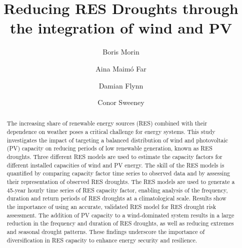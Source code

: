 \documentclass[preprint, 12pt]{elsarticle}
\begin{document}
\begin{frontmatter}
	

\title{Reducing RES Droughts through the integration of wind and PV}

\author[Math]{Boris Morin }

\author[Math]{Aina Maimó Far}

\author[Eng]{Damian Flynn}

\author[Math]{Conor Sweeney}




\begin{abstract}
The increasing share of renewable energy sources (RES) combined with their dependence on weather poses a critical challenge for energy systems. This study investigates the impact of targeting a balanced distribution of wind and photovoltaic (PV) capacity on reducing periods of low renewable generation, known as RES droughts. Three different RES models are used to estimate the capacity factors for different installed capacities of wind and PV energy. The skill of the RES models is quantified by comparing capacity factor time series to observed data and by assessing their representation of observed RES droughts. The RES models are used to generate a 45-year hourly time series of RES capacity factor, enabling analysis of the frequency, duration and return periods of RES droughts at a climatological scale. Results show the importance of using an accurate, validated RES model for RES drought risk assessment. The addition of PV capacity to a wind-dominated system results in a large reduction in the frequency and duration of RES droughts, as well as reducing extremes and seasonal drought patterns. These findings underscore the importance of diversification in RES capacity to enhance energy security and resilience.
\end{abstract}


\end{frontmatter}
\end{document}
